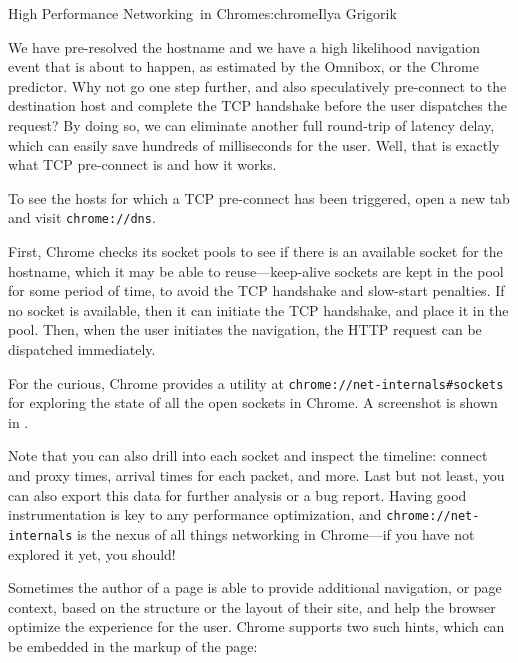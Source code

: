 \begin{aosachapter}{High Performance Networking~in Chrome}{s:chrome}{Ilya Grigorik}

We have pre-resolved the hostname and we have a high likelihood
navigation event that is about to happen, as estimated by the Omnibox,
or the Chrome predictor. Why not go one step further, and also
speculatively pre-connect to the destination host and complete the TCP
handshake before the user dispatches the request? By doing so, we can
eliminate another full round-trip of latency delay, which can easily
save hundreds of milliseconds for the user. Well, that is exactly what
TCP pre-connect is and how it works.

To see the hosts for which a TCP pre-connect has been triggered, open a
new tab and visit \texttt{chrome://dns}.


First, Chrome checks its socket pools to see if there is an available
socket for the hostname, which it may be able to reuse---keep-alive
sockets are kept in the pool for some period of time, to avoid the TCP
handshake and slow-start penalties. If no socket is available, then it
can initiate the TCP handshake, and place it in the pool. Then, when the
user initiates the navigation, the HTTP request can be dispatched
immediately.

For the curious, Chrome provides a utility at
\texttt{chrome://net-internals\#sockets} for exploring the state of all
the open sockets in Chrome. A screenshot is shown in
.


Note that you can also drill into each socket and inspect the timeline:
connect and proxy times, arrival times for each packet, and more. Last
but not least, you can also export this data for further analysis or a
bug report. Having good instrumentation is key to any performance
optimization, and \texttt{chrome://net-internals} is the nexus of all
things networking in Chrome---if you have not explored it yet, you
should!


Sometimes the author of a page is able to provide additional navigation,
or page context, based on the structure or the layout of their site, and
help the browser optimize the experience for the user. Chrome supports
two such hints, which can be embedded in the markup of the page:


\end{aosachapter}
